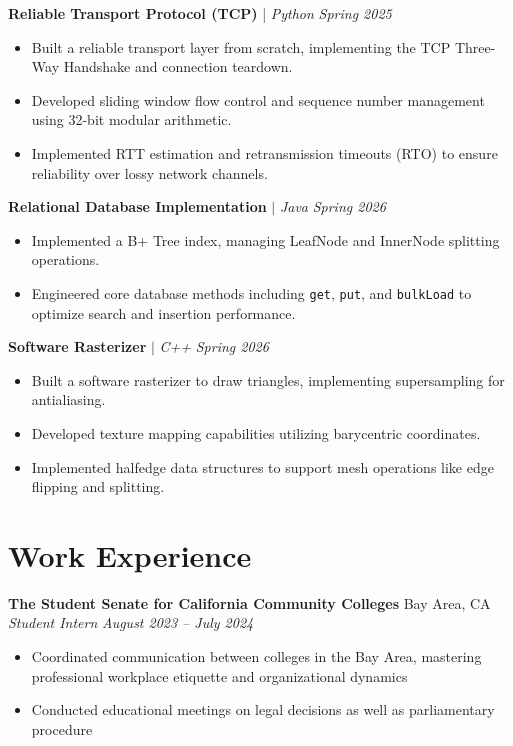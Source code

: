 \documentclass[11pt, letterpaper]{article}
\begin{document}
\textbf{Reliable Transport Protocol (TCP)} | \textit{Python} \hfill \textit{Spring 2025}
\begin{itemize}[leftmargin=0.25in, itemsep=1pt]
\item Built a reliable transport layer from scratch, implementing the TCP Three-Way Handshake and connection teardown.
\item Developed sliding window flow control and sequence number management using 32-bit modular arithmetic.
\item Implemented RTT estimation and retransmission timeouts (RTO) to ensure reliability over lossy network channels.
\end{itemize}

\textbf{Relational Database Implementation} $|$ \textit{Java} \hfill \textit{Spring 2026}
\begin{itemize}[leftmargin=0.25in, itemsep=1pt]
    \item Implemented a B+ Tree index, managing LeafNode and InnerNode splitting operations.
    \item Engineered core database methods including \texttt{get}, \texttt{put}, and \texttt{bulkLoad} to optimize search and insertion performance.
\end{itemize}

\textbf{Software Rasterizer} $|$ \textit{C++} \hfill \textit{Spring 2026}
\begin{itemize}[leftmargin=0.25in, itemsep=1pt]
    \item Built a software rasterizer to draw triangles, implementing supersampling for antialiasing.
    \item Developed texture mapping capabilities utilizing barycentric coordinates.
    \item Implemented halfedge data structures to support mesh operations like edge flipping and splitting.
\end{itemize}


\section{Work Experience}
\textbf{The Student Senate for California Community Colleges} \hfill Bay Area, CA \\
\textit{Student Intern} \hfill \textit{August 2023 -- July 2024}
\begin{itemize}[leftmargin=0.25in, itemsep=1pt]
    \item Coordinated communication between colleges in the Bay Area, mastering professional workplace etiquette and organizational dynamics
    \item Conducted educational meetings on legal decisions as well as parliamentary procedure
\end{itemize}
\end{document}

